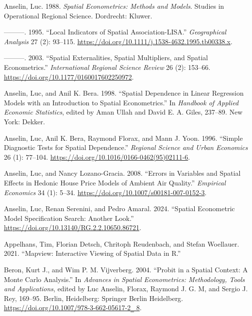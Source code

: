 \documentclass[
  letterpaper,
  DIV=11,
  numbers=noendperiod]{scrreprt}
\newlength{\cslhangindent}
\newlength{\cslentryspacingunit} %
\newenvironment{CSLReferences}[2] %
 {%
  \setlength{\parindent}{0pt}
  \ifodd #1
  \let\oldpar\par
  \def\par{\hangindent=\cslhangindent\oldpar}
  \fi
  \setlength{\parskip}{#2\cslentryspacingunit}
 }%
 {}
\begin{document}
\hypertarget{refs}{}
\begin{CSLReferences}{1}{0}
\leavevmode{}%
Anselin, Luc. 1988. \emph{Spatial {Econometrics}: {Methods} and
{Models}}. Studies in {Operational Regional Science}. {Dordrecht}:
{Kluwer}.

\leavevmode{}%
---------. 1995. {``Local {Indicators} of {Spatial Association-LISA}.''}
\emph{Geographical Analysis} 27 (2): 93--115.
\url{https://doi.org/10.1111/j.1538-4632.1995.tb00338.x}.

\leavevmode{}%
---------. 2003. {``Spatial {Externalities}, {Spatial Multipliers}, and
{Spatial Econometrics}.''} \emph{International Regional Science Review}
26 (2): 153--66. \url{https://doi.org/10.1177/0160017602250972}.

\leavevmode{}%
Anselin, Luc, and Anil K. Bera. 1998. {``Spatial {Dependence} in {Linear
Regression Models} with an {Introduction} to {Spatial Econometrics}.''}
In \emph{Handbook of {Applied Economic Statistics}}, edited by Aman
Ullah and David E. A. Giles, 237--89. {New York}: {Dekker}.

\leavevmode{}%
Anselin, Luc, Anil K. Bera, Raymond Florax, and Mann J. Yoon. 1996.
{``Simple {Diagnostic Tests} for {Spatial Dependence}.''} \emph{Regional
Science and Urban Economics} 26 (1): 77--104.
\url{https://doi.org/10.1016/0166-0462(95)02111-6}.

\leavevmode{}%
Anselin, Luc, and Nancy Lozano-Gracia. 2008. {``Errors in {Variables}
and {Spatial Effects} in {Hedonic House Price Models} of {Ambient Air
Quality}.''} \emph{Empirical Economics} 34 (1): 5--34.
\url{https://doi.org/10.1007/s00181-007-0152-3}.

\leavevmode{}%
Anselin, Luc, Renan Serenini, and Pedro Amaral. 2024. {``Spatial
{Econometric Model Specification Search}: {Another Look}.''}
\url{https://doi.org/10.13140/RG.2.2.10650.86721}.

\leavevmode{}%
Appelhans, Tim, Florian Detsch, Chritoph Reudenbach, and Stefan
Woellauer. 2021. {``Mapview: {Interactive Viewing} of {Spatial Data} in
{R}.''}

\leavevmode{}%
Beron, Kurt J., and Wim P. M. Vijverberg. 2004. {``Probit in a {Spatial
Context}: {A Monte Carlo Analysis}.''} In \emph{Advances in {Spatial
Econometrics}: {Methodology}, {Tools} and {Applications}}, edited by Luc
Anselin, Florax, Raymond J. G. M, and Sergio J. Rey, 169--95. {Berlin,
Heidelberg}: {Springer Berlin Heidelberg}.
\href{https://doi.org/10.1007/978-3-662-05617-2‗\%208}{https://doi.org/10.1007/978-3-662-05617-2‗
8}.


\end{CSLReferences}
\end{document}
